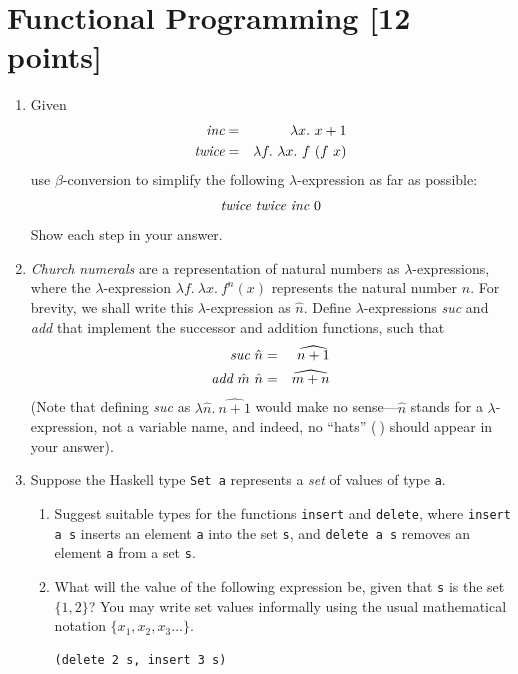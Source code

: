 \documentclass{article}
\begin{document}
\newpage

\section{Functional Programming [12 points]}

\begin{enumerate}
\item

Given
\begin{eqnarray*}
\mbox{\it inc}&=&\lambda x.~x+1\\
\mbox{\it twice}&=&\lambda f.~\lambda x.~f~(f~x)
\end{eqnarray*}
use $\beta$-conversion to simplify the following $\lambda$-expression as far as possible:
\[
\mbox{\it twice}~\mbox{\it twice}~\mbox{\it inc}~0
\]
Show each step in your answer.


\item
{\em Church numerals} are a representation of natural numbers as
$\lambda$-expressions, where the $\lambda$-expression $\lambda
f.~\lambda x.~f^n(x)$ represents the natural number $n$. For brevity,
we shall write this $\lambda$-expression as $\hat{n}$. Define
$\lambda$-expressions {\it suc} and {\it add} that implement the
successor and addition functions, such that
\begin{eqnarray*}
\mbox{\it suc}~\hat{n}&=&\widehat{n+1}\\
\mbox{\it add}~\hat{m}~\hat{n}&=&\widehat{m+n}
\end{eqnarray*}
(Note that defining {\em suc} as $\lambda \hat{n}.~\widehat{n+1}$
would make no sense---$\hat{n}$ stands for a $\lambda$-expression, not
a variable name, and indeed, no ``hats'' ($\hat{~}$) should appear in
your answer).


\item
Suppose the Haskell type \verb!Set a! represents a {\em set} of values
of type \verb!a!.
\begin{enumerate}
\item
Suggest suitable types for the functions \verb!insert! and
\verb!delete!, where \verb!insert a s! inserts an element \verb!a!
into the set \verb!s!, and \verb!delete a s! removes an element
\verb!a! from a set \verb!s!.

\item
What will the value of the following expression be, given that
\verb!s! is the set $\{1,2\}$? You may write set values informally
using the usual mathematical notation $\{x_1, x_2, x_3\dots\}$.
\begin{verbatim}
(delete 2 s, insert 3 s)
\end{verbatim}


\end{enumerate}
\end{enumerate}
\end{document}
